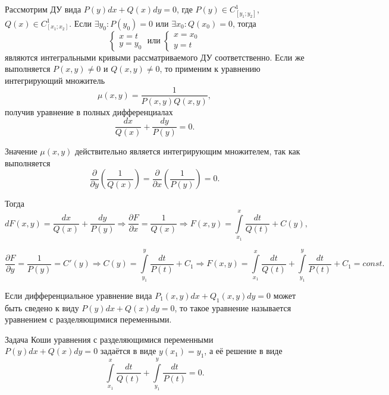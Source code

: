 Рассмотрим ДУ вида $P(y)dx + Q(x)dy = 0$, где $P(y) \in C_{[y_1; y_2]}^1$, $Q(x) \in C_{[x_1; x_2]}^1$. Если $\exists y_0: P(y_0) = 0$ или  $\exists x_0: Q(x_0) = 0$, тогда
\begin{equation}
    \begin{cases}
        x = t \\ 
        y = y_0
    \end{cases} \;
    \text{или} \;
    \begin{cases}
        x = x_0 \\ 
        y = t
    \end{cases}
\end{equation}
являются интегральными кривыми рассматриваемого ДУ соответственно. Если же выполняется $P(x, y) \neq 0$ и $Q(x, y) \neq 0$, то применим к уравнению интегрирующий множитель
\[ \mu(x, y) = \frac{1}{P(x, y)Q(x, y)}, \]
получив уравнение в полных дифференциалах
\begin{equation}
    \frac{dx}{Q(x)} + \frac{dy}{P(y)} = 0.
\end{equation}

Значение $\mu(x, y)$ действительно является интегрирующим множителем, так как выполняется
\begin{equation}
    \frac{\partial}{\partial y} \left( \frac{1}{Q(x)} \right) =  \frac{\partial}{\partial x} \left( \frac{1}{P(y)} \right) = 0.
\end{equation}

Тогда
\begin{equation}
    dF(x, y) = \frac{dx}{Q(x)} + \frac{dy}{P(y)} \Rightarrow \frac{\partial F}{\partial x} = \frac{1}{Q(x)} \Rightarrow F(x, y) = \int\limits_{x_1}^{x} \frac{dt}{Q(t)} + C(y),
\end{equation}

\begin{equation}
    \frac{\partial F}{\partial y} = \frac{1}{P(y)} = C'(y) \Rightarrow C(y) = \int\limits_{y_1}^{y} \frac{dt}{P(t)} + C_1 \Rightarrow F(x, y) = \int\limits_{x_1}^{x} \frac{dt}{Q(t)} + \int\limits_{y_1}^{y} \frac{dt}{P(t)} + C_1 = const.
\end{equation}

\begin{definition}
    Если дифференциальное уравнение вида $P_1(x, y)dx + Q_1(x, y)dy = 0$ может быть сведено к виду $P(y)dx + Q(x)dy = 0$, то такое уравнение называется уравнением с разделяющимися переменными.
\end{definition}

\begin{proposition}
    Задача Коши уравнения с разделяющимися переменными $P(y)dx + Q(x)dy = 0$ задаётся в виде $y(x_1) = y_1$, а её решение в виде 
    \begin{equation}
        \int\limits_{x_1}^{x} \frac{dt}{Q(t)} + \int\limits_{y_1}^{y} \frac{dt}{P(t)} = 0.
    \end{equation}
\end{proposition}

